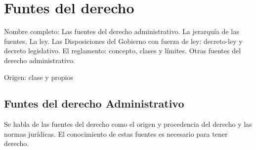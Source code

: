 \setcounter{section}{6}
\section{Funtes del derecho}

Nombre completo: Las fuentes del derecho administrativo. La jerarquía de las fuentes. La ley. Las Disposiciones del Gobierno con fuerza de ley: decreto-ley y decreto legislativo. El reglamento: concepto, clases y límites. Otras fuentes del derecho administrativo.

Origen: clase y propios

\localtableofcontents

\subsection{Funtes del derecho Administrativo} %
    Se habla de las fuentes del derecho como el origen y procedencia del derecho y las normas jurídicas. El conocimiento de estas fuentes es necesario para tener derecho.

